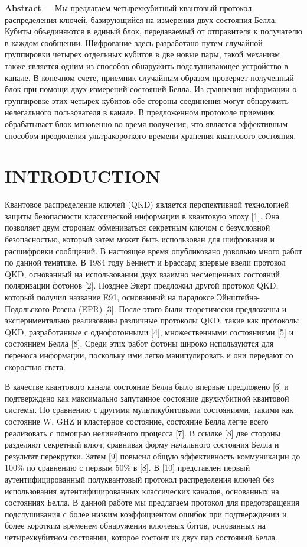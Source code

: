 \documentclass[a4paper,11pt]{article}
\begin{document}
\textbf{Abstract} --- Мы предлагаем четырехкубитный квантовый протокол распределения ключей, базирующийся на измерении двух состояния Белла. Кубиты объединяются в единый блок, передаваемый от отправителя к получателю в каждом сообщении. Шифрование здесь разработано путем случайной группировки четырех отдельных кубитов в две новые пары, такой механизм также является одним из способов обнаружить подслушивающее устройство в канале. В конечном счете, приемник случайным образом проверяет полученный блок при помощи двух измерений состояний Белла. Из сравнения информации о группировке этих четырех кубитов обе стороны соединения могут обнаружить нелегального пользователя в канале. В предложенном протоколе приемник обрабатывает блок мгновенно во время получения, что является эффективным способом преодоления ультракороткого времени хранения квантового состояния.



\section{INTRODUCTION}

Квантовое распределение ключей (QKD) является перспективной технологией защиты безопасности классической информации в квантовую эпоху [1]. Она позволяет двум сторонам обмениваться секретным ключом с безусловной безопасностью, который затем может быть использован для шифрования и расшифровки сообщений. В настоящее время опубликовано довольно много работ по данной тематике. В 1984 году Беннетт и Брассард впервые ввели протокол QKD, основанный на использовании двух взаимно несмещенных состояний поляризации фотонов [2]. Позднее Экерт предложил другой протокол QKD, который получил название E91, основанный на парадоксе Эйнштейна-Подольского-Розена (EPR) [3]. После этого были теоретически предложены и экспериментально реализованы различные протоколы QKD, такие как протоколы QKD, разработанные с однофотонными [4], множественными состояниями [5] и состоянием Белла [8]. Среди этих работ фотоны широко используются для переноса информации, поскольку ими легко манипулировать и они передают со скоростью света.

В качестве квантового канала состояние Белла было впервые предложено [6] и подтверждено как максимально запутанное состояние двухкубитной квантовой системы. По сравнению с другими мультикубитовыми состояниями, такими как состояние W, GHZ и кластерное состояние, состояние Белла легче всего реализовать с помощью нелинейного процесса [7]. В ссылке [8] две стороны разделяют секретный ключ, сравнивая форму начального состояния Белла и результат перекрутки. Затем [9] повысил общую эффективность коммуникации до 100\% по сравнению с первым 50\% в [8]. В [10] представлен первый аутентифицированный полуквантовый протокол распределения ключей без использования аутентифицированных классических каналов, основанных на состояниях Белла. В данной работе мы предлагаем протокол для предотвращения подслушивания с более низким коэффициентом ошибок при подтверждении и более коротким временем обнаружения ключевых битов, основанных на четырехкубитном состоянии, которое состоит из двух пар состояний Белла.
\end{document}
